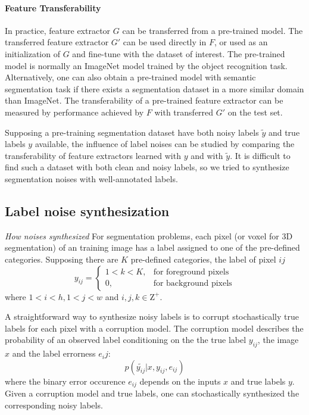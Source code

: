 \paragraph{Feature Transferability}
In practice, feature extractor $G$ can be transferred from a pre-trained model.
The transferred feature extractor $G'$ can be used directly in $F$, or used as an initialization of $G$ and fine-tune with the dataset of interest.
The pre-trained model is normally an ImageNet model trained by the object recognition task.
Alternatively, one can also obtain a pre-trained model with semantic segmentation task if there exists a segmentation dataset in a more similar domain than ImageNet.
The transferability of a pre-trained feature extractor can be measured by performance achieved by $F$ with transferred $G'$ on the test set.

Supposing a pre-training segmentation dataset have both noisy labels $\tilde{y}$ and true labels $y$ available, the influence of label noises can be studied by comparing the transferability of feature extractors learned with $y$ and with $\tilde{y}$. It is difficult to find such a dataset with both clean and noisy labels, so we tried to synthesize segmentation noises with well-annotated labels.



\subsection{Label noise synthesization}
\label{subsec:noises}

\noindent \textit{How noises synthesized}
\noindent
For segmentation problems, each pixel (or voxel for 3D segmentation) of an training image has a label assigned to one of the pre-defined categories.
Supposing there are $K$ pre-defined categories, the label of pixel ${ij}$
\[
  y_{ij} =
    \begin{cases}
      1 < k < K, & \text{for foreground pixels} \\
      0, & \text{for background pixels}
    \end{cases}
\]
where $1 < i < h, 1 < j < w$ and $i,j,k \in \mathrm{Z}^+$.

A straightforward way to synthesize noisy labels is to corrupt stochastically true labels for each pixel with a corruption model.
The corruption model describes the probability of an observed label conditioning on the the true label $y_{ij}$, the image $x$ and the label errorness $e_ij$:
$$p(\tilde{y_{ij}} \vert x, y_{ij}, e_{ij})$$
where the binary error occurence $e_{ij}$ depends on the inputs $x$ and true labels $y$.
Given a corruption model and true labels, one can stochastically synthesized the corresponding noisy labels.

